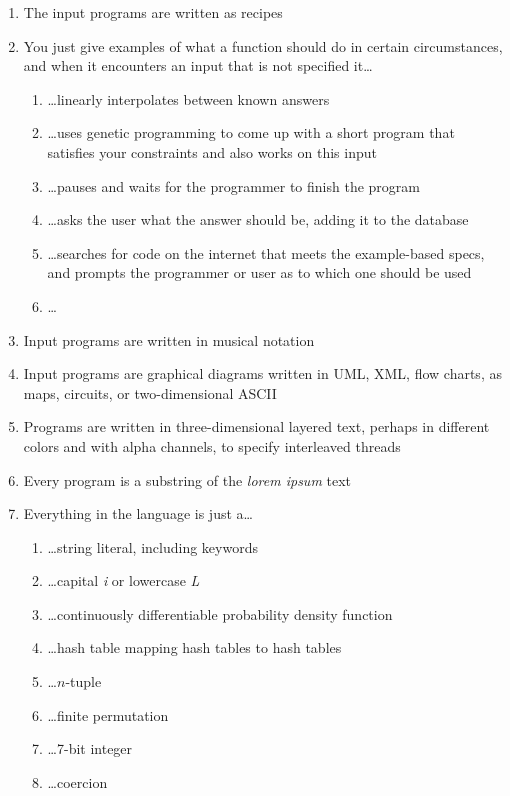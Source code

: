 \documentclass[acmtocl]%
{boviktrans}
\begin{document}
\begin{enumerate}
\item The input programs are written as recipes
\item You just give examples of what a function should do in certain circumstances, and when it encounters an input that is not specified it\ldots
  \begin{enumerate}
    \item \ldots linearly interpolates between known answers
    \item \ldots uses genetic programming to come up with a short program that satisfies your constraints and also works on this input
    \item \ldots pauses and waits for the programmer to finish the program
    \item \ldots asks the user what the answer should be, adding it to the database
    \item \ldots searches for code on the internet that meets the example-based specs, and prompts the programmer or user as to which one should be used
    \item \ldots
  \end{enumerate}
\item Input programs are written in musical notation
\item Input programs are graphical diagrams written in UML, XML, flow charts, as maps, circuits, or two-dimensional ASCII
\item Programs are written in three-dimensional layered text, perhaps in different colors and with alpha channels, to specify interleaved threads
\item Every program is a substring of the {\it lorem ipsum} text
\item Everything in the language is just a\ldots
   \begin{enumerate}
     \item \ldots string literal, including keywords
     \item \ldots capital {\it i} or lowercase {\it L}
     \item \ldots continuously differentiable probability density function
     \item \ldots hash table mapping hash tables to hash tables
     \item \ldots $n$-tuple
     \item \ldots finite permutation
     \item \ldots 7-bit integer
     \item \ldots coercion

\end{enumerate}
\end{enumerate}
\end{document}

